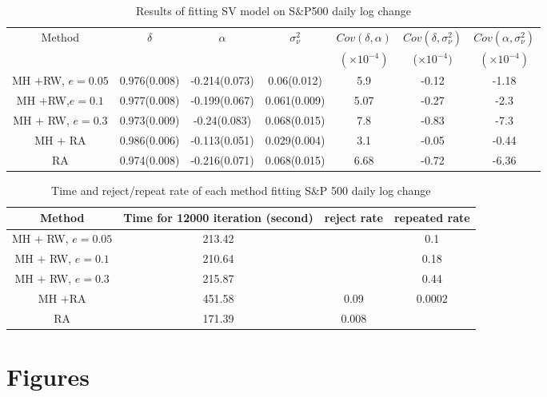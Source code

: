 \documentclass{article}
\begin{document}
\begin{table}[H]
\centering
\begin{tabular}{|c|c|c|c|c|c|c|}
\hline
Method& $\delta$ & $\alpha$& $\sigma_\nu^2$& $Cov(\delta,\alpha)$& $Cov(\delta,\sigma_\nu^2)$&$Cov(\alpha,\sigma_\nu^2)$  \\
&&&&$(\times 10^{-4})$&($\times 10^{-4})$&$(\times 10^{-4})$\\
\hline
MH $+$RW, $e=0.05$ & 0.976(0.008) & -0.214(0.073) & 0.06(0.012) &5.9&-0.12& -1.18 \\
\hline
MH $+$RW,$e=0.1$& 0.977(0.008) &  -0.199(0.067) & 0.061(0.009)&5.07&-0.27&-2.3\\
\hline
MH $+$ RW, $e=0.3$ & 0.973(0.009) & -0.24(0.083) & 0.068(0.015)&7.8&-0.83&-7.3\\
\hline
MH $+$ RA &  0.986(0.006) & -0.113(0.051) & 0.029(0.004)&3.1&-0.05&-0.44\\
\hline
RA& 0.974(0.008) & -0.216(0.071) & 0.068(0.015)&6.68&-0.72&-6.36\\
\hline
\end{tabular}
\caption{Results of fitting SV model on S$\&$P500 daily log change}\label{2}
\end{table}

\begin{table}[H]
\begin{tabular}{|c|c|c|c|}
\hline
Method&Time for 12000 iteration (second)& reject rate& repeated rate  \\
\hline
MH $+$ RW, $e=0.05$ & 213.42 &  & 0.1\\
\hline
MH $+$ RW, $e=0.1$&  210.64 &  & 0.18 \\
\hline
MH $+$ RW, $e=0.3$ & 215.87 &  & 0.44\\
\hline
MH $+$RA & 451.58 & 0.09 & 0.0002\\
\hline
RA & 171.39 & 0.008 & \\
\hline
\end{tabular}
\caption{Time and reject/repeat rate of each method fitting S$\&$P 500 daily log change}\label{6}
\end{table}

\section{Figures}
\end{document}
